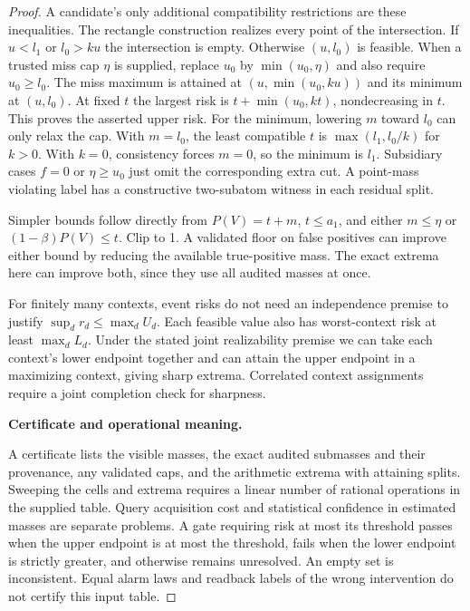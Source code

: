 \begin{proof}
A candidate's only additional compatibility restrictions are these inequalities. The rectangle construction realizes every point of the intersection. If \(u<l_1\) or \(l_0>ku\) the intersection is empty. Otherwise \((u,l_0)\) is feasible. When a trusted miss cap \(\eta\) is supplied, replace \(u_0\) by \(\min(u_0,\eta)\) and also require \(u_0\ge l_0\). The miss maximum is attained at \((u,\min(u_0,ku))\) and its minimum at \((u,l_0)\). At fixed \(t\) the largest risk is \(t+\min(u_0,kt)\), nondecreasing in \(t\). This proves the asserted upper risk. For the minimum, lowering \(m\) toward \(l_0\) can only relax the cap. With \(m=l_0\), the least compatible \(t\) is \(\max(l_1,l_0/k)\) for \(k>0\). With \(k=0\), consistency forces \(m=0\), so the minimum is \(l_1\). Subsidiary cases \(f=0\) or \(\eta\ge u_0\) just omit the corresponding extra cut. A point-mass violating label has a constructive two-subatom witness in each residual split.

Simpler bounds follow directly from \(P(V)=t+m\), \(t\le a_1\), and either \(m\le\eta\) or \((1-\beta)P(V)\le t\). Clip to 1. A validated floor on false positives can improve either bound by reducing the available true-positive mass. The exact extrema here can improve both, since they use all audited masses at once.

For finitely many contexts, event risks do not need an independence premise to justify \(\sup_d r_d\le \max_d U_d\). Each feasible value also has worst-context risk at least \(\max_d L_d\). Under the stated joint realizability premise we can take each context's lower endpoint together and can attain the upper endpoint in a maximizing context, giving sharp extrema. Correlated context assignments require a joint completion check for sharpness.

\textbf{Certificate and operational meaning.}

A certificate lists the visible masses, the exact audited submasses and their provenance, any validated caps, and the arithmetic extrema with attaining splits. Sweeping the cells and extrema requires a linear number of rational operations in the supplied table. Query acquisition cost and statistical confidence in estimated masses are separate problems. A gate requiring risk at most its threshold passes when the upper endpoint is at most the threshold, fails when the lower endpoint is strictly greater, and otherwise remains unresolved. An empty set is inconsistent. Equal alarm laws and readback labels of the wrong intervention do not certify this input table.

\end{proof}

